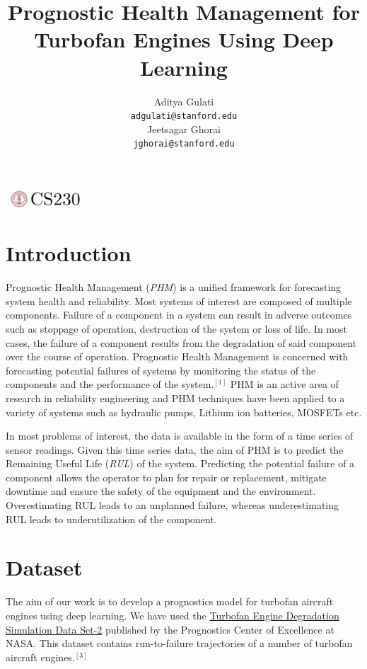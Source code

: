 \documentclass[a4paper,12pt]{article}
\title{Prognostic Health Management for Turbofan Engines Using Deep Learning}
\author{
Aditya Gulati\\
\texttt{adgulati@stanford.edu} \\
\And
Jeetsagar Ghorai \\
\texttt{jghorai@stanford.edu} \\
}
\begin{document}
\begin{center}
\includegraphics[width=3cm, height=0.7cm]{CS230}
\end{center}
\maketitle


\section{Introduction}

Prognostic Health Management (\emph{PHM}) is a unified framework for forecasting
system health and reliability. Most systems of interest are composed of multiple
components. Failure of a component in a system can result in adverse outcomes
such as stoppage of operation, destruction of the system or loss of life. In
most cases, the failure of a component results from the degradation of said
component over the course of operation. Prognostic Health Management is
concerned with forecasting potential failures of systems by monitoring the
status of the components and the performance of the system.\(^{[1]}\) PHM is an
active area of research in reliability engineering and PHM techniques have been
applied to a variety of systems such as hydraulic pumps, Lithium ion batteries,
MOSFETs etc.

In most problems of interest, the data is available in the form of a time series
of sensor readings. Given this time series data, the aim of PHM is to predict
the Remaining Useful Life (\emph{RUL}) of the system. Predicting the potential
failure of a component allows the operator to plan for repair or replacement,
mitigate downtime and ensure the safety of the equipment and the environment.
Overestimating RUL leads to an unplanned failure, whereas underestimating RUL
leads to underutilization of the component.


\section{Dataset}

The aim of our work is to develop a prognostics model for turbofan aircraft
engines using deep learning. We have used the
\href{https://ti.arc.nasa.gov/tech/dash/groups/pcoe/prognostic-data-repository}
{Turbofan Engine Degradation Simulation Data Set-2} published by the Prognostics
Center of Excellence at NASA. This dataset contains run-to-failure trajectories
of a number of turbofan aircraft engines.\(^{[3]}\)
\end{document}
